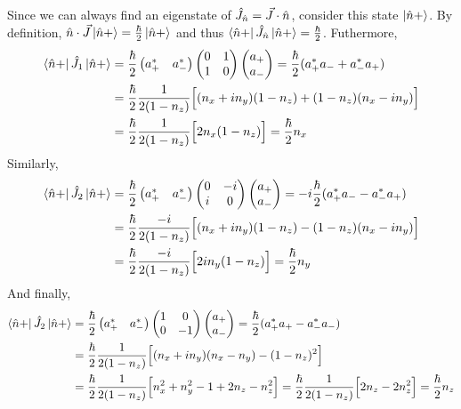 \documentclass[12pt]{extarticle}
\newcommand{\Jn}{\J_{\hat{n}}}
\begin{document}
Since we can always find an eigenstate of $\Jn = \vec{J} \cdot \hat{n}$, consider this state $\left| \hat{n} +  \right>$. By definition, $\hat{n} \cdot \vec{J} \left| \hat{n} +  \right> = \frac{\hbar}{2} \left| \hat{n} +  \right>$ and thus $\bra{\hat{n} +} \Jn \ket{\hat{n} + } = \frac{\hbar}{2}$. Futhermore, 
\begin{align*}
\left< \hat{n} + \right| \hat{J}_1 \left| \hat{n} +  \right> & = \frac{\hbar}{2}
\begin{pmatrix}
a_{+}^* & a_{-}^* 
\end{pmatrix}
\begin{pmatrix}
0 & 1 \\
1 & 0
\end{pmatrix}
\begin{pmatrix}
a_{+} \\
a_{-}
\end{pmatrix} = \frac{\hbar}{2} (a_{+}^* a_{-} + a_{-}^* a_{+}) \\ & = \frac{\hbar}{2} \frac{1}{2(1 - n_z)} \Big[(n_x + i n_y)(1 - n_z) + (1 - n_z)(n_x - i n_y) \Big] \\
& = \frac{\hbar}{2} \frac{1}{2(1 - n_z)} \Big[2 n_x(1 - n_z) \Big] = \frac{\hbar}{2} n_x
\end{align*}
Similarly, 
\begin{align*}
\left< \hat{n} + \right| \hat{J}_2 \left| \hat{n} +  \right> & = \frac{\hbar}{2}
\begin{pmatrix}
a_{+}^* & a_{-}^* 
\end{pmatrix}
\begin{pmatrix}
0 & -i \\
i & 0
\end{pmatrix}
\begin{pmatrix}
a_{+} \\
a_{-}
\end{pmatrix} = -i \frac{\hbar}{2} (a_{+}^* a_{-} - a_{-}^* a_{+}) \\ & = \frac{\hbar}{2} \frac{-i}{2(1 - n_z)} \Big[(n_x + i n_y)(1 - n_z) - (1 - n_z)(n_x - i n_y) \Big] \\
& = \frac{\hbar}{2} \frac{-i}{2(1 - n_z)} \Big[2i n_y(1 - n_z) \Big] = \frac{\hbar}{2} n_y
\end{align*}
And finally,
\begin{align*}
\left< \hat{n} + \right| \hat{J}_2 \left| \hat{n} +  \right> & = \frac{\hbar}{2}
\begin{pmatrix}
a_{+}^* & a_{-}^* 
\end{pmatrix}
\begin{pmatrix}
1 & 0 \\
0 & -1
\end{pmatrix}
\begin{pmatrix}
a_{+} \\
a_{-}
\end{pmatrix} = \frac{\hbar}{2} (a_{+}^* a_{+} - a_{-}^* a_{-}) \\ & = \frac{\hbar}{2} \frac{1}{2(1 - n_z)} \Big[(n_x + i n_y)(n_x - n_y) - (1 - n_z)^2 \Big] \\
& = \frac{\hbar}{2} \frac{1}{2(1 - n_z)} \Big[n_x^2 + n_y^2 - 1 + 2n_z - n_z^2  \Big] = \frac{\hbar}{2} \frac{1}{2(1 - n_z)} \Big[ 2n_z - 2n_z^2  \Big] =  \frac{\hbar}{2} n_z
\end{align*} 
\end{document}
